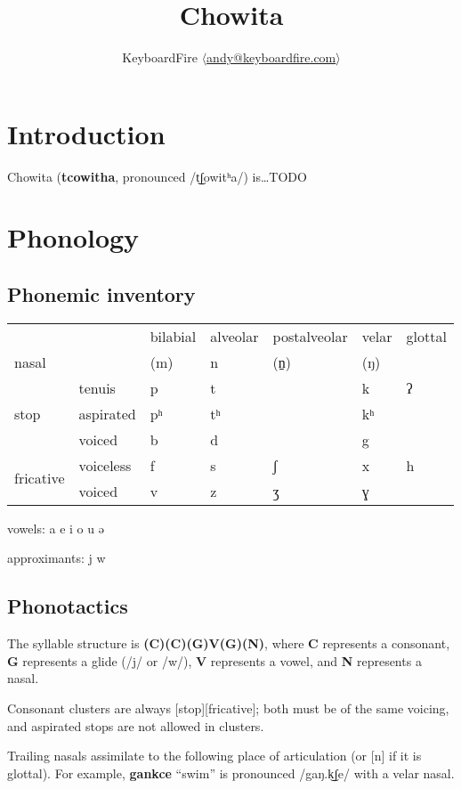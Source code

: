 \documentclass{article}
\title{Chowita}
\author{KeyboardFire $\langle$\href{mailto:andy@keyboardfire.com}{andy@keyboardfire.com}$\rangle$}
\begin{document}
\maketitle
\tableofcontents
\newpage

\section{Introduction}

Chowita (\textbf{tcowitha}, pronounced /t͜ʃowitʰa/) is\ldots TODO

\section{Phonology}

\subsection{Phonemic inventory}

\begin{tabular}{lllllll}
    && bilabial & alveolar & postalveolar & velar & glottal \\
    nasal && (m) & n & (n̠) & (ŋ) \\
    \multirow{3}{*}{stop} & tenuis & p & t & & k & ʔ \\
    & aspirated & pʰ & tʰ & & kʰ \\
    & voiced & b & d & & g \\
    \multirow{2}{*}{fricative} & voiceless & f & s & ʃ & x & h \\
    & voiced & v & z & ʒ & ɣ \\
\end{tabular}\bigskip

vowels: a e i o u ə

approximants: j w

\subsection{Phonotactics}

The syllable structure is \textbf{(C)(C)(G)V(G)(N)}, where \textbf{C}
represents a consonant, \textbf{G} represents a glide (/j/ or /w/), \textbf{V}
represents a vowel, and \textbf{N} represents a nasal.

Consonant clusters are always [stop][fricative]; both must be of the same
voicing, and aspirated stops are not allowed in clusters.

Trailing nasals assimilate to the following place of articulation (or [n] if it
is glottal). For example, \textbf{gankce} ``swim'' is pronounced /gaŋ.k͜ʃe/ with
a velar nasal.
\end{document}
